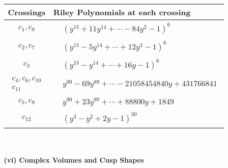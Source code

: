 \documentclass[1p]{elsarticle_modified}
\theoremstyle{definition}
\begin{document}
\begin{tabular}{m{50pt}|m{274pt}}
Crossings & \hspace{64pt}Riley Polynomials at each crossing \\
\hline $$\begin{aligned}c_{1},c_{8}\end{aligned}$$&$\begin{aligned}
&(y^{15}+11 y^{14}+\cdots-84 y^2-1)^{6}
\end{aligned}$\\
\hline $$\begin{aligned}c_{2},c_{7}\end{aligned}$$&$\begin{aligned}
&(y^{15}-5 y^{14}+\cdots+12 y^3-1)^{6}
\end{aligned}$\\
\hline $$\begin{aligned}c_{3}\end{aligned}$$&$\begin{aligned}
&(y^{15}- y^{14}+\cdots+16 y-1)^{6}
\end{aligned}$\\
\hline $$\begin{aligned}c_{4},c_{6},c_{10}\\c_{11}\end{aligned}$$&$\begin{aligned}
&y^{90}-69 y^{89}+\cdots-21058454840 y+431766841
\end{aligned}$\\
\hline $$\begin{aligned}c_{5},c_{9}\end{aligned}$$&$\begin{aligned}
&y^{90}+23 y^{89}+\cdots+88800 y+1849
\end{aligned}$\\
\hline $$\begin{aligned}c_{12}\end{aligned}$$&$\begin{aligned}
&(y^3- y^2+2 y-1)^{30}
\end{aligned}$\\
\hline
\end{tabular}\\~\\
\newpage\flushleft \textbf{(vi) Complex Volumes and Cusp Shapes}
\end{document}
